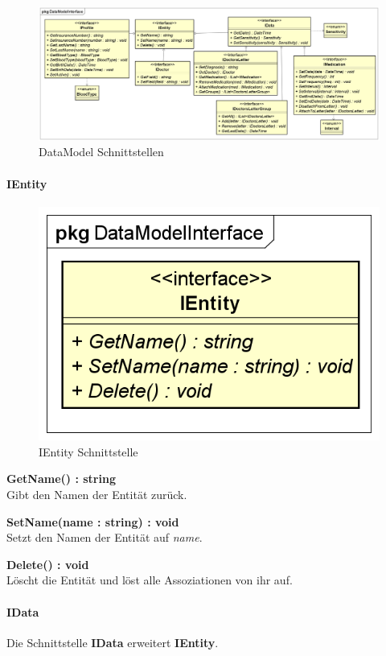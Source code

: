 \documentclass[a4paper]{scrreprt}
\begin{document}
\begin{figure}[H]
\centering
\includegraphics[width=0.75\textheight]{graphics/Klassendiagramme/Model/DataModelInterfacePackage.png}
\caption{DataModel Schnittstellen}
\end{figure}

\paragraph{IEntity}
\begin{figure}[H]
\centering
\includegraphics[width=0.45\textheight]{graphics/Klassendiagramme/Model/IEntity.png}
\caption{IEntity Schnittstelle}
\end{figure}
\textbf{GetName() : string}\\
Gibt den Namen der Entität zurück.

\textbf{SetName(name : string) : void}\\
Setzt den Namen der Entität auf \textit{name}.

\textbf{Delete() : void}\\
Löscht die Entität und löst alle Assoziationen von ihr auf.

\paragraph{IData}
Die Schnittstelle \textbf{IData} erweitert \textbf{IEntity}.
\end{document}
